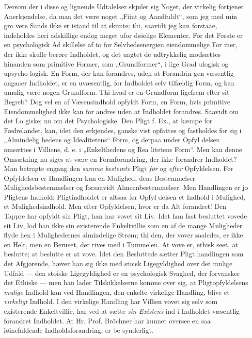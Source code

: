 \documentclass[12pt]{book}
\newcommand{\opage}[1]{\marginnote{\footnotesize\textit{[#1]}}}
\begin{document}
Dersom der i disse og lignende Udtalelser skjuler
sig Noget, der virkelig fortjener Anerkjendelse, da maa
det være noget „Fiint og Aandfuldt“, som jeg med min gro\-%
vere Sands ikke er istand til at skimte; thi, saavidt jeg
kan forstaae, indeholdes heri adskillige endog meget ufor\-%
døielige Elementer. For det Første er en psychologisk Ad\-%
skillelse af to for Selvhedsenergien eiendommelige For\-%
mer, der ikke skulle berøre Indholdet, og det uagtet de
udtrykkelig modsættes hinanden som primitive Former,
som „Grundformer“, i lige Grad ulogisk og upsycho\-%
logisk. En Form, der kan forandres, uden at Forandrin\-%
gen væsentlig angaaer Indholdet, er en uvæsentlig, for
Indholdet selv tilfældig Form, og kan umulig være nogen
Grundform. Thi hvad er en Grundform ligefrem efter
sit Begreb? Dog vel en af Væsensindhold opfyldt Form,
en Form, hvis primitive Eiendommelighed ikke kan for\-%
andres uden at Indholdet forandres. Saavidt om det Lo\-%
giske; nu om det Psychologiske. Den Pligt f. Ex.,
at kæmpe for Fædrelandet, kan, idet den erkjendes,
ganske vist opfattes og fastholdes for sig i „Almindelig\-%
hedens og Idealitetens“ Form, og derpaa under Opfyl\-%
delsen omsættes i Villiens, d. e. i „Enkelthedens og Rea\-%
litetens Form“. Men kan denne Omsætning nu siges at
være en Formforandring, der ikke forandrer Indholdet?
\opage{38}\setcounter{footnote}{0}%
Man betragte engang den \emph{samme bestemte} Pligt \emph{før} og
\emph{efter} Opfyldelsen. Før Opfyldelsen er Handlingen kun
en Mulighed, dens Bestemmelser Mulighedsbestemmelser
og forsaavidt Almeenbestemmelser. Men Handlingen er
jo Pligtens Indhold; Pligtindholdet er altsaa før Opfyl\-%
delsen et Indhold i Mulighed, et Mulighedsindhold. Men
efter Opfyldelsen, hvor er da Alt forandret! Den Tappre
har opfyldt sin Pligt, han har vovet sit Liv. Idet han
fast besluttet vovede sit Liv, lod han ikke sin existerende
Enkeltvillie som en af de mange Muligheder flyde hen i
Mulighedernes almindelige Strøm; thi den, der vover
saaledes, er ikke en Helt, men en Beruset, der rives med
i Tummelen. At vove er, ethisk seet, at beslutte; at
beslutte er at vove. Idet den Besluttede sætter Pligt\-%
handlingen som det Afgjørende, hæver han sig ikke med
stoisk Ligegyldighed over det mulige Udfald --- den
stoiske Ligegyldighed er en psychologisk Svaghed, der
forvansker det Ethiske --- men han lader Tilskikkelserne
komme over sig, at Pligtopfyldelsens \emph{mulige} Indhold
kan ved Handlingen, den enkelte virkelige Handling,
blive et \emph{virkeligt} Indhold. I den virkelige Handling
har Villien vovet sig selv som existerende Enkeltvillie,
har ved at sætte \emph{sin Existens} ind i Indholdet væsentlig
forandret Indholdet. At Hr. Prof. Bröchner har kunnet
oversee en saa iøinefaldende Indholdsforandring, er be\-%
synderligt.
\end{document}
